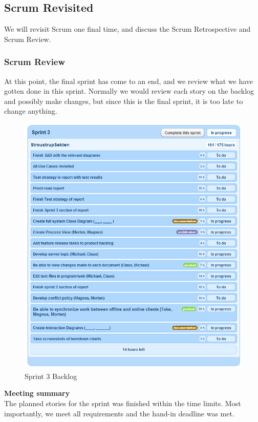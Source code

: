 \subsection{Scrum Revisited}
We will revisit Scrum one final time, and discuss the Scrum Retrospective and Scrum Review.
\subsubsection{Scrum Review}
At this point, the final sprint has come to an end, and we review what we have gotten done in this sprint. Normally we would review each story on the backlog and possibly make changes, but since this is the final sprint, it is too late to change anything.\\
\newline
\begin{figure}[H]
  \includegraphics[width=\textwidth]{illustrations/sprint3backlog.PNG}
  \caption{Sprint 3 Backlog}
  \label{sprint3backlog}
\end{figure}
\textbf{Meeting summary}\\
The planned stories for the sprint was finished within the time limits. Most importantly, we meet all requirements and the hand-in deadline was met.\\
